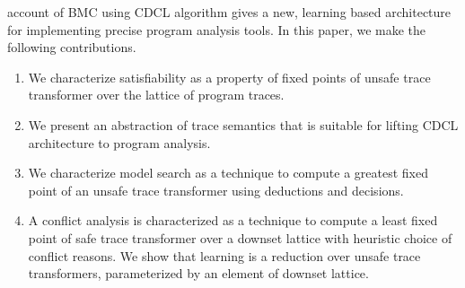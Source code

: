 account of BMC using CDCL algorithm gives a new, learning based architecture for 
implementing precise program analysis tools.   
%
In this paper, we make the following contributions.
%
\begin{enumerate}
  \item We characterize satisfiability as a property of fixed points of
  unsafe trace transformer over the lattice of program traces.
  \item We present an abstraction of trace semantics that is suitable for
  lifting CDCL architecture to program analysis. 
  \item We characterize model search as a technique to compute a greatest
    fixed point of an unsafe trace transformer using deductions and decisions.
  \item A conflict analysis is characterized as a technique to compute
    a least fixed point of safe trace transformer over a downset lattice 
    with heuristic choice of conflict reasons.  We show that learning is 
    a reduction over unsafe trace transformers, parameterized by an element of downset lattice.  
\end{enumerate}
%

